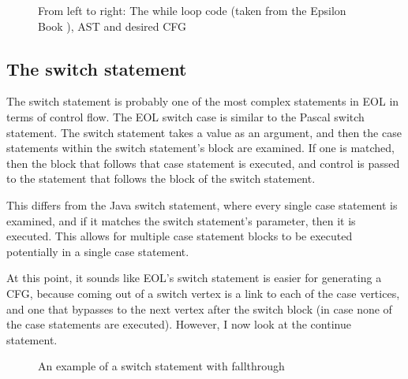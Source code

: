 \begin{figure}
\centering
\begin{minipage}{.3\textwidth}
  \centering
  
\end{minipage}%
\begin{minipage}{.3\textwidth}
  \centering
\end{minipage}
\begin{minipage}{.3\textwidth}
  \centering
\end{minipage}
\caption{From left to right: The while loop code (taken from the Epsilon Book \cite{epsilonBook}), AST and desired CFG}
\label{fig:while}
\end{figure}

\subsection{The switch statement}

The switch statement is probably one of the most complex statements in EOL in terms of control flow. The EOL switch case is similar to the Pascal switch statement. The switch statement takes a value as an argument, and then the case statements within the switch statement's block are examined. If one is matched, then the block that follows that case statement is executed, and control is passed to the statement that follows the block of the switch statement.

This differs from the Java switch statement, where every single case statement is examined, and if it matches the switch statement's parameter, then it is executed. This allows for multiple case statement blocks to be executed potentially in a single case statement.

At this point, it sounds like EOL's switch statement is easier for generating a CFG, because coming out of a switch vertex is a link to each of the case vertices, and one that bypasses to the next vertex after the switch block (in case none of the case statements are executed). However, I now look at the continue statement.

\begin{figure}[h]

\caption{An example of a switch statement with fallthrough}
\label{lst:switchFallthrough}
\end{figure}

